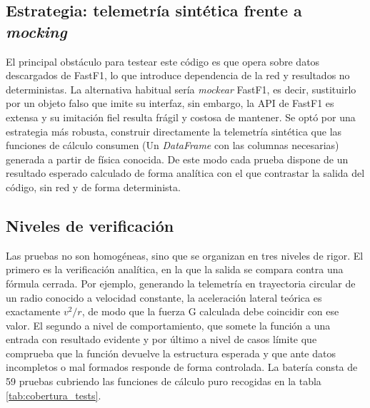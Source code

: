 \documentclass[12pt,a4paper,twoside,openright]{book}
\begin{document}
\subsection{Estrategia: telemetría sintética frente a \textit{mocking}}
El principal obstáculo para testear este código es que opera sobre datos descargados de FastF1, lo que introduce dependencia de la red y resultados no deterministas.
La alternativa habitual sería \textit{mockear} FastF1, es decir, sustituirlo por un objeto falso que imite su interfaz, sin embargo, la API de FastF1 es extensa y su imitación fiel resulta frágil y costosa de mantener.
Se optó por una estrategia más robusta, construir directamente la telemetría sintética que las funciones de cálculo consumen (Un \textit{DataFrame} con las columnas necesarias) generada a partir de física conocida. De este modo
cada prueba dispone de un resultado esperado calculado de forma analítica con el que contrastar la salida del código, sin red y de forma determinista.

\subsection{Niveles de verificación}
Las pruebas no son homogéneas, sino que se organizan en tres niveles de rigor. El primero es la verificación analítica, en la que la salida se compara contra una fórmula cerrada. Por ejemplo, generando la telemetría en trayectoria circular de un radio conocido a velocidad constante,
la aceleración lateral teórica es exactamente $v^2/r$, de modo que la fuerza G calculada debe coincidir con ese valor. El segundo a nivel de comportamiento, que somete la función a una entrada con resultado evidente y por último a nivel de casos límite que comprueba que la función devuelve la estructura esperada y que ante datos incompletos o mal formados responde de forma controlada.
La batería consta de 59 pruebas cubriendo las funciones de cálculo puro recogidas en la tabla \ref{tab:cobertura_tests}.
\end{document}
